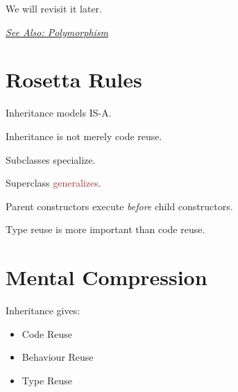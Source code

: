\documentclass[11pt,a4paper]{book}
\begin{document}
We will revisit it later.

\smallskip
\noindent
\hyperref[chap:polymorphism]{\emph{See Also: Polymorphism}}


\section{Rosetta Rules}

\begin{rosettarule}

Inheritance models IS-A.

\end{rosettarule}

\begin{rosettarule}

Inheritance is not merely code reuse.

\end{rosettarule}

\begin{rosettarule}

\textcolor{RosettaOrange}{Subclasses} \textcolor{RosettaGold}{specialize}.

\end{rosettarule}

\begin{rosettarule}

\textcolor{RosettaRoyalPurple}{Superclass} \textcolor{brown}{generalizes}.

\end{rosettarule}

\begin{rosettarule}

Parent constructors execute \emph{before} child constructors.

\end{rosettarule}

\begin{rosettarule}

Type reuse is more important than code reuse.

\end{rosettarule}

\newpage
\section{Mental Compression}

Inheritance gives:
\begin{itemize}
\item Code Reuse
\item Behaviour Reuse
\item Type Reuse
\end{itemize}
\end{document}
